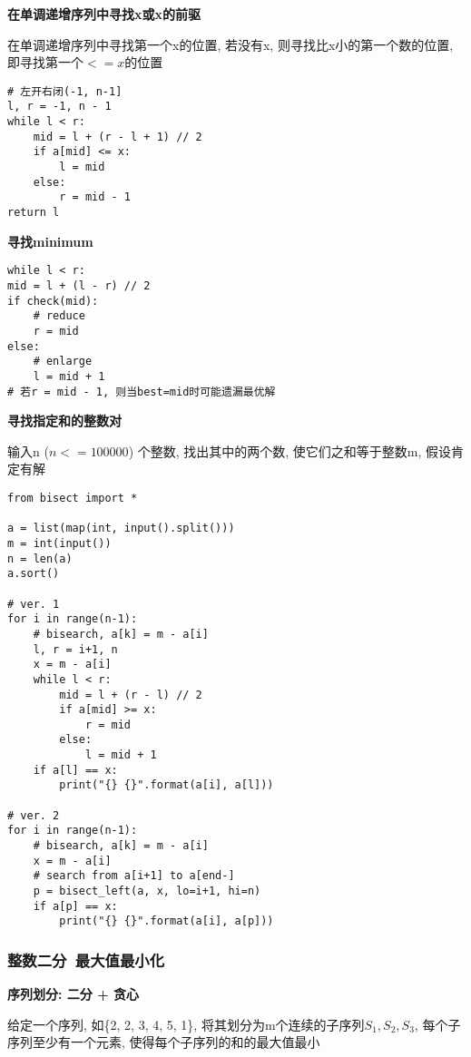 \documentclass[../main]{subfiles}
\begin{document}
\begin{sloppy}
\textbf{在单调递增序列中寻找x或x的前驱}

在单调递增序列中寻找第一个x的位置, 若没有x, 则寻找比x小的第一个数的位置, 即寻找第一个$<=x$的位置

\begin{lstlisting}[style = Python]
# 左开右闭(-1, n-1]
l, r = -1, n - 1
while l < r:
    mid = l + (r - l + 1) // 2
    if a[mid] <= x:
        l = mid
    else:
        r = mid - 1
return l
\end{lstlisting}

\textbf{寻找minimum}

\begin{lstlisting}[style = Python]
while l < r:
mid = l + (l - r) // 2
if check(mid):
    # reduce
    r = mid
else:
    # enlarge
    l = mid + 1
# 若r = mid - 1, 则当best=mid时可能遗漏最优解
\end{lstlisting}

\newpage

\textbf{寻找指定和的整数对}

输入n ($n <= 100000$) 个整数, 找出其中的两个数, 使它们之和等于整数m, 假设肯定有解

\begin{lstlisting}[style = Python]
from bisect import *

a = list(map(int, input().split()))
m = int(input())
n = len(a)
a.sort()

# ver. 1
for i in range(n-1):
    # bisearch, a[k] = m - a[i]
    l, r = i+1, n
    x = m - a[i]
    while l < r:
        mid = l + (r - l) // 2
        if a[mid] >= x:
            r = mid
        else:
            l = mid + 1
    if a[l] == x:
        print("{} {}".format(a[i], a[l]))

# ver. 2
for i in range(n-1):
    # bisearch, a[k] = m - a[i]
    x = m - a[i]
    # search from a[i+1] to a[end-]
    p = bisect_left(a, x, lo=i+1, hi=n)
    if a[p] == x:
        print("{} {}".format(a[i], a[p]))
\end{lstlisting}

\newpage

\subsubsection{整数二分\ 最大值最小化}

\textbf{序列划分: 二分 + 贪心}

给定一个序列, 如\{2, 2, 3, 4, 5, 1\}, 将其划分为m个连续的子序列$S_1, S_2, S_3$, 每个子序列至少有一个元素, 使得每个子序列的和的最大值最小


\end{sloppy}
\end{document}

